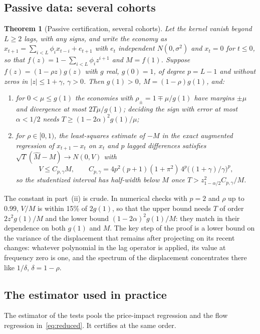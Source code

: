 \documentclass[12pt]{article}
\newtheorem{theorem}{Theorem}
\theoremstyle{definition}
\theoremstyle{remark}
\begin{document}
\subsection{Passive data: several cohorts}

\begin{theorem}[Passive certification, several cohorts]\label{thm:multi}
Let the kernel vanish beyond $L\ge2$ lags, with any signs, and write the economy as $x_{t+1}=\sum_{i<L}\phi_ix_{t-i}+e_{t+1}$ with $e_t$ independent $N(0,\sigma^2)$ and $x_t=0$ for $t\le0$, so that $f(z)=1-\sum_{i<L}\phi_iz^{i+1}$ and $M=f(1)$. Suppose $f(z)=(1-\rho z)g(z)$ with $g$ real, $g(0)=1$, of degree $p=L-1$ and without zeros in $|z|\le1+\gamma$, $\gamma>0$. Then $g(1)>0$, $M=(1-\rho)g(1)$, and:
\begin{enumerate}[label=(\roman*)]
\item for $0<\mu\le g(1)$ the economies with $\rho_\pm=1\mp\mu/g(1)$ have margins $\pm\mu$ and divergence at most $2T\mu/g(1)$; deciding the sign with error at most $\alpha<1/2$ needs $T\ge(1-2\alpha)^2g(1)/\mu$;
\item for $\rho\in[0,1)$, the least-squares estimate of $-M$ in the exact augmented regression of $x_{t+1}-x_t$ on $x_t$ and $p$ lagged differences satisfies $\sqrt T(\hat M-M)\to N(0,V)$ with
\[
V\le C_{p,\gamma}M,\qquad C_{p,\gamma}=4p^2(p+1)(1+\pi^2)\,4^p\big((1+\gamma)/\gamma\big)^p,
\]
so the studentized interval has half-width below $M$ once $T>z_{1-\alpha/2}^2C_{p,\gamma}/M$.
\end{enumerate}
\end{theorem}

The constant in part~(ii) is crude. In numerical checks with $p=2$ and $\rho$ up to $0.99$, $V/M$ is within 15\% of $2g(1)$, so that the upper bound needs $T$ of order $2z^2g(1)/M$ and the lower bound $(1-2\alpha)^2g(1)/M$: they match in their dependence on both $g(1)$ and $M$. The key step of the proof is a lower bound on the variance of the displacement that remains after projecting on its recent changes: whatever polynomial in the lag operator is applied, its value at frequency zero is one, and the spectrum of the displacement concentrates there like $1/\delta$, $\delta=1-\rho$.

\subsection{The estimator used in practice}

The estimator of the tests pools the price-impact regression and the flow regression in~\eqref{eq:reduced}. It certifies at the same order.
\end{document}
